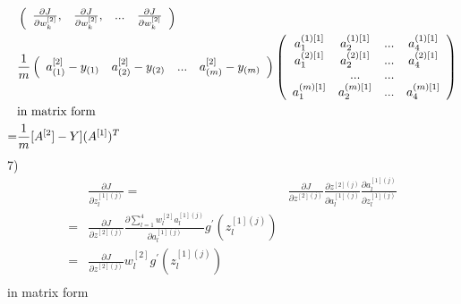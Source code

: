 \documentclass[a4paper]{article}
\begin{document}
\begin{align*}
&\left( \begin{array} {c c c c}
 \frac{\partial J}{\partial w_k^{[2]}}, & \frac{\partial J}{\partial w_k^{[2]}}, &... & 
\frac{\partial J}{\partial w_k^{[2]}}\\
\end{array} \right)\\
	&\frac{1}{m} \left( \begin{array} {c c c c}
	 a_{(1)}^{[2]} - y_{(1)} & a_{(2)}^{[2]} - y_{(2)} & ... & a_{(m)}^{[2]} - y_{(m)}  \\
	\end{array} \right)
	\left( \begin{array} {c c c c}
	 a_1^{(1)[1]} &  a_2^{(1)[1]} & ... & a_4^{(1)[1]}  \\
	 a_1^{(2)[1]} &  a_2^{(2)[1]} & ... & a_4^{(2)[1]} \\
		&...&...& \\
	 a_1^{(m)[1]} &  a_2^{(m)[1]} & ... & a_4^{(m)[1]} \\
	\end{array} \right)\\
	&\textrm {in matrix form}\\
	= &\frac{1}{m} [A^{[2}] - Y] (A^{[1]})^T	
\end{align*}
7)
\begin{align*}
	&\frac{\partial J}{ \partial z_l ^{[1](j)}}
= & \frac{\partial J}{ \partial z ^{[2](j)}}
	\frac{\partial z ^{[2](j)}}{ \partial a_l ^{[1](j)}}
	\frac{ \partial a_l ^{[1](j)}}{ \partial z_l ^{[1](j)}}\\
= & \frac{\partial J}{ \partial z ^{[2](j)}} 
	\frac{\partial \sum_{l=1}^4 w_l^{[2]} a_l^{[1](j)}}{ \partial a_l ^{[1](j)}}
	g^{'}(z_l^{[1](j)})\\
= & \frac{\partial J}{ \partial z ^{[2](j)}} 
	w_l^{[2]}
	g^{'}(z_l^{[1](j)})\\
\end{align*}
in matrix form
\end{document}
